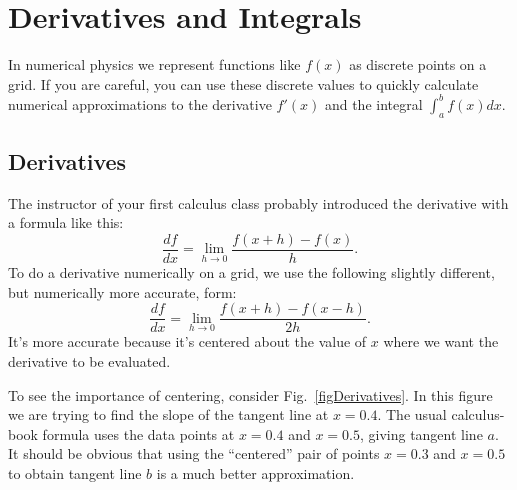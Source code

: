 \chapter{Derivatives and Integrals}

\label{chap:Calculus}

In numerical physics we represent functions like $f(x)$ as discrete points on
a grid.  If you are careful, you can use these discrete values to quickly
calculate numerical approximations to the derivative $f'(x)$ and the integral
$\int_a^b f(x) dx$.

\medskip

\section{Derivatives}

The instructor of your first calculus class probably introduced the
derivative with a formula like this:
\begin{equation}
    \frac{df}{dx} =
    \lim_{ h \rightarrow 0} \frac{f(x+h)-f(x) }{ h} .
\end{equation}
To do a derivative numerically on a grid, we use the following slightly
different, but numerically more accurate, form:
\begin{equation}
\frac{df }{ dx} = \lim_{ h \rightarrow 0} \frac{f(x+h)-f(x-h) }{ 2 h} .
\end{equation}
It's more accurate because it's centered about the value of $x$ where we want
the derivative to be evaluated.


To see the importance of centering, consider Fig.~\ref{figDerivatives}. In
this figure we are trying to find the slope of the tangent line at $x=0.4$.
The usual calculus-book formula uses the data points at $x=0.4$ and $x=0.5$,
giving tangent line $a$. It should be obvious that using the ``centered''
pair of points $x=0.3$ and $x=0.5$ to obtain tangent line $b$ is a much
better approximation.


